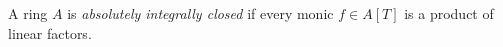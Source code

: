 \begin{definition}
\label{definition-absolutely-integrally-closed}
A ring $A$ is {\it absolutely integrally closed} if every
monic $f \in A[T]$ is a product of linear factors.
\end{definition}